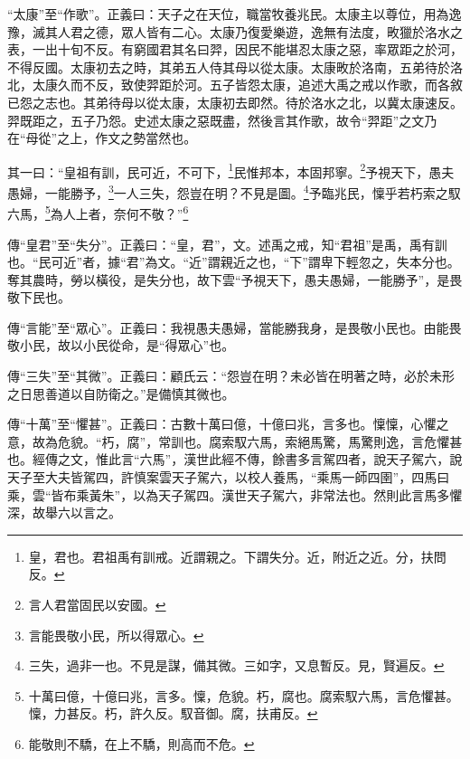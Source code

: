 {\noindent\shu{}\fzkt “太康”至“作歌”。正義曰：天子之在天位，職當牧養兆民。太康主以尊位，用為逸豫，滅其人君之德，眾人皆有二心。太康乃復愛樂遊，逸無有法度，畋獵於洛水之表，一出十旬不反。有窮國君其名曰羿，因民不能堪忍太康之惡，率眾距之於河，不得反國。太康初去之時，其弟五人侍其母以從太康。太康畋於洛南，五弟待於洛北，太康久而不反，致使羿距於河。五子皆怨太康，追述大禹之戒以作歌，而各敘已怨之志也。其弟待母以從太康，太康初去即然。待於洛水之北，以冀太康速反。羿既距之，五子乃怨。史述太康之惡既盡，然後言其作歌，故令“羿距”之文乃在“母從”之上，作文之勢當然也。 \par}

其一曰：“皇祖有訓，民可近，不可下，\footnote{皇，君也。君祖禹有訓戒。近謂親之。下謂失分。近，附近之近。分，扶問反。}民惟邦本，本固邦寧。\footnote{言人君當固民以安國。}予視天下，愚夫愚婦，一能勝予，\footnote{言能畏敬小民，所以得眾心。}一人三失，怨豈在明？不見是圖。\footnote{三失，過非一也。不見是謀，備其微。三如字，又息暫反。見，賢遍反。}予臨兆民，懍乎若朽索之馭六馬，\footnote{十萬曰億，十億曰兆，言多。懍，危貌。朽，腐也。腐索馭六馬，言危懼甚。懍，力甚反。朽，許久反。馭音御。腐，扶甫反。}為人上者，奈何不敬？”\footnote{能敬則不驕，在上不驕，則高而不危。}


{\noindent\zhuan{}\fzbyks 傳“皇君”至“失分”。正義曰：“皇，君”，文。述禹之戒，知“君祖”是禹，禹有訓也。“民可近”者，據“君”為文。“近”謂親近之也，“下”謂卑下輕忽之，失本分也。奪其農時，勞以橫役，是失分也，故下雲“予視天下，愚夫愚婦，一能勝予”，是畏敬下民也。 \par}

{\noindent\zhuan{}\fzbyks 傳“言能”至“眾心”。正義曰：我視愚夫愚婦，當能勝我身，是畏敬小民也。由能畏敬小民，故以小民從命，是“得眾心”也。 \par}

{\noindent\zhuan{}\fzbyks 傳“三失”至“其微”。正義曰：顧氏云：“怨豈在明？未必皆在明著之時，必於未形之日思善道以自防衛之。”是備慎其微也。 \par}

{\noindent\zhuan{}\fzbyks 傳“十萬”至“懼甚”。正義曰：古數十萬曰億，十億曰兆，言多也。懍懍，心懼之意，故為危貌。“朽，腐”，常訓也。腐索馭六馬，索絕馬驚，馬驚則逸，言危懼甚也。經傳之文，惟此言“六馬”，漢世此經不傳，餘書多言駕四者，說天子駕六，說天子至大夫皆駕四，許慎案雲天子駕六，以校人養馬，“乘馬一師四圉”，四馬曰乘，雲“皆布乘黃朱”，以為天子駕四。漢世天子駕六，非常法也。然則此言馬多懼深，故舉六以言之。 \par}

